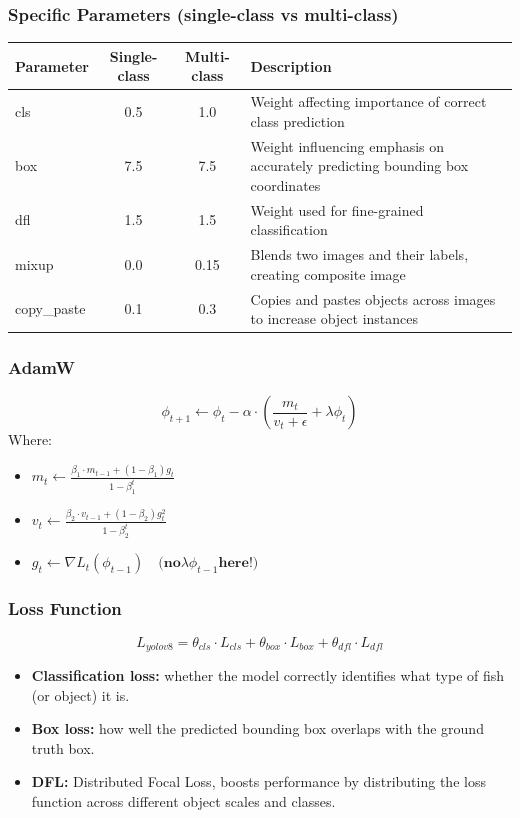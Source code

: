 \documentclass[serif]{beamer}  %
\begin{document}
\begin{frame}
\frametitle{Specific Parameters (single-class vs multi-class)}
\begin{center}
\small
\begin{tabular}{|l|c|c|p{4cm}|}
\hline
    \textbf{Parameter} & \textbf{Single-class} & \textbf{Multi-class} & \textbf{Description} \\
\hline
cls & 0.5 & 1.0 & Weight affecting importance of correct class prediction\\
\hline
box & 7.5 & 7.5 & Weight influencing emphasis on accurately predicting bounding box coordinates\\
\hline
dfl & 1.5 & 1.5 & Weight used for fine-grained classification\\
\hline
mixup & 0.0 & 0.15 & Blends two images and their labels, creating composite image\\
\hline
copy\_paste & 0.1 & 0.3 & Copies and pastes objects across images to increase object instances\\
\hline
\end{tabular}
\end{center}
\end{frame}

\begin{frame}
\frametitle{AdamW}
$$
\phi_{t+1} \leftarrow \phi_t - \alpha \cdot (\frac{m_t}{v_t + \epsilon} + \lambda \phi_t)
$$
\vspace{0.5cm}
Where:
\begin{itemize}
	\item $m_t \leftarrow \frac{\beta_1 \cdot m_{t-1} + (1-\beta_1)g_t}{1 - \beta_1^t}$
	\item $v_t \leftarrow \frac{\beta_2 \cdot v_{t-1} + (1-\beta_2)g_t^2}{1 - \beta_2^t}$
	\item $g_t \leftarrow \nabla L_t(\phi_{t-1}) \quad  \mathbf{ (no  }\lambda \phi_{t-1} \mathbf{  here!)}$
\end{itemize}
\end{frame}

\begin{frame}
\frametitle{Loss Function}
$$
L_{yolov8} = \theta_{cls}\cdot L_{cls} + \theta_{box}\cdot L_{box} + \theta_{dfl}\cdot L_{dfl} 
$$
\begin{itemize}
	\item \textbf{Classification loss:} whether the model correctly identifies what type of fish (or object) it is.
	\item \textbf{Box loss:} how well the predicted bounding box overlaps with the ground truth box.
	\item \textbf{DFL:} Distributed Focal Loss, boosts performance by distributing the loss function across different object scales and classes.
\end{itemize}
\end{frame}
\end{document}
